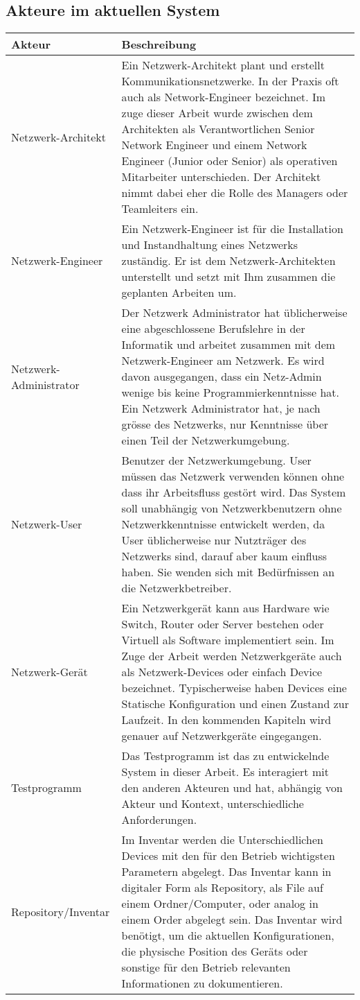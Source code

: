 \documentclass[
	ngerman,
	toc=listof, %
	toc=bibliography, %
	footnotes=multiple, %
	parskip=half, %
	numbers=noendperiod %
]{scrartcl}
\begin{document}
	\subsection{Akteure im aktuellen System}
		\begin{tabularx}{\textwidth}{lX}
			\toprule
			Akteur &  Beschreibung \\
			\midrule
			Netzwerk-Architekt  & Ein Netzwerk-Architekt plant und erstellt Kommunikationsnetzwerke. In der Praxis oft auch als Network-Engineer bezeichnet. Im zuge dieser Arbeit wurde zwischen dem Architekten als Verantwortlichen Senior Network Engineer und einem Network Engineer (Junior oder Senior) als operativen Mitarbeiter unterschieden. Der Architekt nimmt dabei eher die Rolle des Managers oder Teamleiters ein. \\ 
			Netzwerk-Engineer  & Ein Netzwerk-Engineer ist für die Installation und Instandhaltung eines Netzwerks zuständig. Er ist dem Netzwerk-Architekten unterstellt und setzt mit Ihm zusammen die geplanten Arbeiten um. \\
			Netzwerk-Administrator  & Der Netzwerk Administrator hat üblicherweise eine abgeschlossene Berufslehre in der Informatik und arbeitet zusammen mit dem Netzwerk-Engineer am Netzwerk. Es wird davon ausgegangen, dass ein Netz-Admin wenige bis keine Programmierkenntnisse hat. Ein Netzwerk Administrator hat, je nach grösse des Netzwerks, nur Kenntnisse über einen Teil der Netzwerkumgebung. \\
			Netzwerk-User & Benutzer der Netzwerkumgebung. User müssen das Netzwerk verwenden können ohne dass ihr Arbeitsfluss gestört wird. Das System soll unabhängig von Netzwerkbenutzern ohne Netzwerkkenntnisse entwickelt werden, da User üblicherweise nur Nutzträger des Netzwerks sind, darauf aber kaum einfluss haben. Sie wenden sich mit Bedürfnissen an die Netzwerkbetreiber. \\
			\midrule
			Netzwerk-Gerät  & Ein Netzwerkgerät kann aus Hardware wie Switch, Router oder Server bestehen oder Virtuell als Software implementiert sein. Im Zuge der Arbeit werden Netzwerkgeräte auch als Netzwerk-Devices oder einfach Device bezeichnet. Typischerweise haben Devices eine Statische Konfiguration und einen Zustand zur Laufzeit. In den kommenden Kapiteln wird genauer auf Netzwerkgeräte eingegangen. \\
			Testprogramm &  Das Testprogramm ist das zu entwickelnde System in dieser Arbeit. Es interagiert mit den anderen Akteuren und hat, abhängig von Akteur und Kontext, unterschiedliche Anforderungen. \\
			Repository/Inventar &  Im Inventar werden die Unterschiedlichen Devices mit den für den Betrieb wichtigsten Parametern abgelegt. Das Inventar kann in digitaler Form als Repository, als File auf einem Ordner/Computer, oder analog in einem Order abgelegt sein. Das Inventar wird benötigt, um die aktuellen Konfigurationen, die physische Position des Geräts oder sonstige für den Betrieb relevanten Informationen zu dokumentieren. \\
			\bottomrule
		\end{tabularx}
\end{document}
